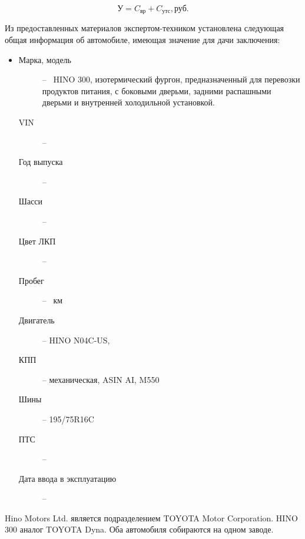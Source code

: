 \begin{equation}\label{112}
 \text{У} = C_\text{вр} + C_\text{утс},    \text{руб.}
\end{equation}



 \par Из предоставленных материалов   экспертом-техником установлена следующая общая информация об автомобиле, имеющая значение для дачи заключения:\\
 \parbox[]{10cm}{}
	\begin{itemize}
		\item[ ] 
			\begin{description}
			\item[Марка, модель] -- \,  HINO 300, изотермический фургон, предназначенный для перевозки продуктов питания, с боковыми дверьми, задними распашными дверьми и внутренней холодильной установкой.
			\item[VIN] -- \vin
			\item[Год выпуска] -- 
			\item[Шасси] -- 
			\item[Цвет ЛКП] -- 
			\item[Пробег] --  \, км%
			\item[Двигатель] -- HINO N04C-US, 
			\item[КПП] -- механическая, ASIN AI, M550
			\item[Шины] -- 195/75R16C
	    	\item[ПТС] --	
	    	\item[Дата ввода в эксплуатацию] --
		\end{description}
		\end{itemize}
	

Hino Motors Ltd. является подразделением TOYOTA Motor Corporation. HINO 300 аналог TOYOTA Dyna. Оба автомобиля собираются на одном заводе. 	
	
